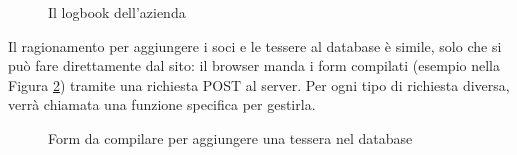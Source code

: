 \documentclass[12pt]{report}
\begin{document}
\begin{figure}
	\caption{Il logbook dell'azienda}
	\label{fig:logbook}
\end{figure}

Il ragionamento per aggiungere i soci e le tessere al database è simile, solo che si può fare direttamente dal sito: il browser manda i form compilati (esempio nella Figura \ref{fig:add_tessera_form}) tramite una richiesta POST al server. Per ogni tipo di richiesta diversa, verrà chiamata una funzione specifica per gestirla.
 
\begin{figure}
	\caption{Form da compilare per aggiungere una tessera nel database}
	\label{fig:add_tessera_form}
\end{figure}
\end{document}
